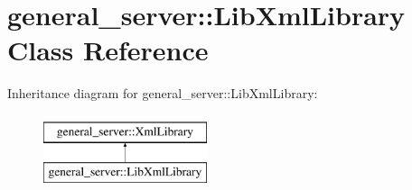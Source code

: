 \hypertarget{classgeneral__server_1_1LibXmlLibrary}{\section{general\-\_\-server\-:\-:\-Lib\-Xml\-Library \-Class \-Reference}
\label{classgeneral__server_1_1LibXmlLibrary}
}
\-Inheritance diagram for general\-\_\-server\-:\-:\-Lib\-Xml\-Library\-:\begin{figure}[H]
\begin{center}
\leavevmode
\includegraphics[height=2.000000cm]{classgeneral__server_1_1LibXmlLibrary}
\end{center}
\end{figure}
